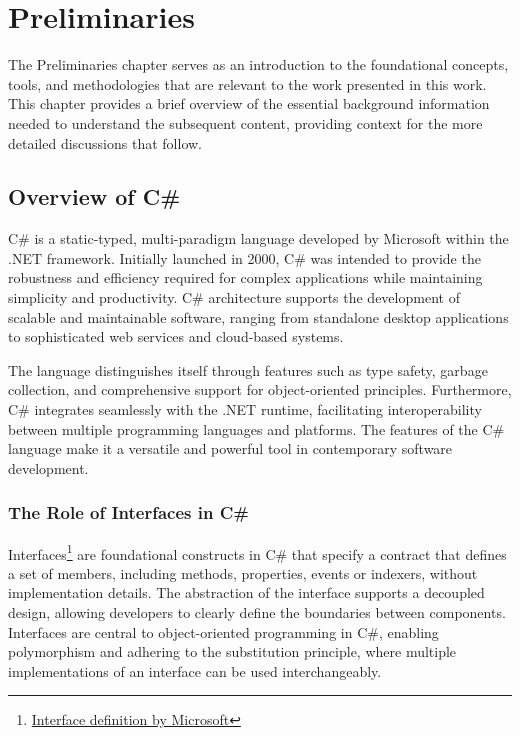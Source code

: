 \chapter{Preliminaries\label{chap:preliminaries}}

The Preliminaries chapter serves as an introduction to the foundational concepts, tools, and methodologies that are relevant to the work presented in this work. This chapter provides a brief overview of the essential background information needed to understand the subsequent content, providing context for the more detailed discussions that follow. 

\section{Overview of C\#}

C\# is a static-typed, multi-paradigm language developed by Microsoft within the .NET framework. Initially launched in 2000, C\# was intended to provide the robustness and efficiency required for complex applications while maintaining simplicity and productivity. C\# architecture supports the development of scalable and maintainable software, ranging from standalone desktop applications to sophisticated web services and cloud-based systems.

The language distinguishes itself through features such as type safety, garbage collection, and comprehensive support for object-oriented principles. Furthermore, C\# integrates seamlessly with the .NET runtime, facilitating interoperability between multiple programming languages and platforms. The features of the C\# language make it a versatile and powerful tool in contemporary software development.

\subsection{The Role of Interfaces in C\#}

Interfaces\footnote{\href{https://learn.microsoft.com/en-us/dotnet/csharp/fundamentals/types/interfaces}{Interface definition by Microsoft}} are foundational constructs in C\# that specify a contract that defines a set of members, including methods, properties, events or indexers, without implementation details. The abstraction of the interface supports a decoupled design, allowing developers to clearly define the boundaries between components. Interfaces are central to object-oriented programming in C\#, enabling polymorphism and adhering to the substitution principle, where multiple implementations of an interface can be used interchangeably.

